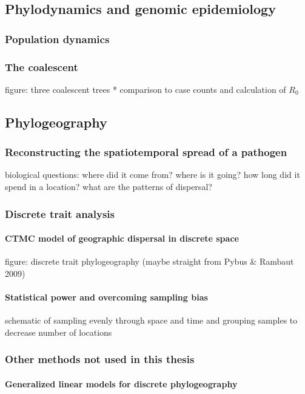     \subsection{Phylodynamics and genomic epidemiology}
      \subsubsection{Population dynamics}
      \subsubsection{The coalescent}
      figure: three coalescent trees *
      comparison to case counts and calculation of $R_0$

    \subsection{Phylogeography}

      \subsubsection{Reconstructing the spatiotemporal spread of a pathogen}
      biological questions: where did it come from? where is it going? how long did it spend in a location? what are the patterns of dispersal?
      \subsubsection{Discrete trait analysis}

        \paragraph*{CTMC model of geographic dispersal in discrete space}
        figure: discrete trait phylogeography (maybe straight from Pybus \& Rambaut 2009)
        \paragraph*{Statistical power and overcoming sampling bias}
        schematic of sampling evenly through space and time and grouping samples to decrease number of locations

      \subsubsection{Other methods not used in this thesis}

        \paragraph*{Generalized linear models for discrete phylogeography}
